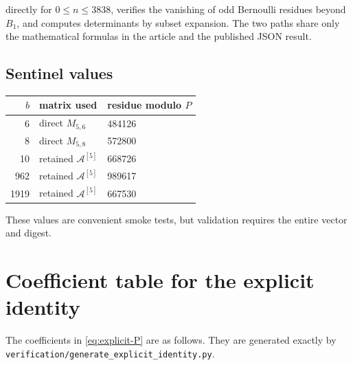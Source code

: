 \documentclass[11pt]{article}
\theoremstyle{definition}
\newcommand{\A}{\mathcal{A}}
\begin{document}
directly for $0\le n\le3838$, verifies the vanishing of odd Bernoulli
residues beyond $B_1$, and computes determinants by subset expansion.
The two paths share only the mathematical formulas in the article and
the published JSON result.

\subsection{Sentinel values}

\begin{center}
\begin{tabular}{rll}
\toprule
$b$&matrix used&residue modulo $P$\\
\midrule
6&direct $M_{5,6}$&484126\\
8&direct $M_{5,8}$&572800\\
10&retained $\A^{[5]}$&668726\\
962&retained $\A^{[5]}$&989617\\
1919&retained $\A^{[5]}$&667530\\
\bottomrule
\end{tabular}
\end{center}

These values are convenient smoke tests, but validation requires the
entire vector and digest.
 \section{Coefficient table for the explicit identity}
\label{app:coefficients}

The coefficients in \eqref{eq:explicit-P} are as follows.  They are generated exactly by \nolinkurl{verification/generate_explicit_identity.py}.
\end{document}
